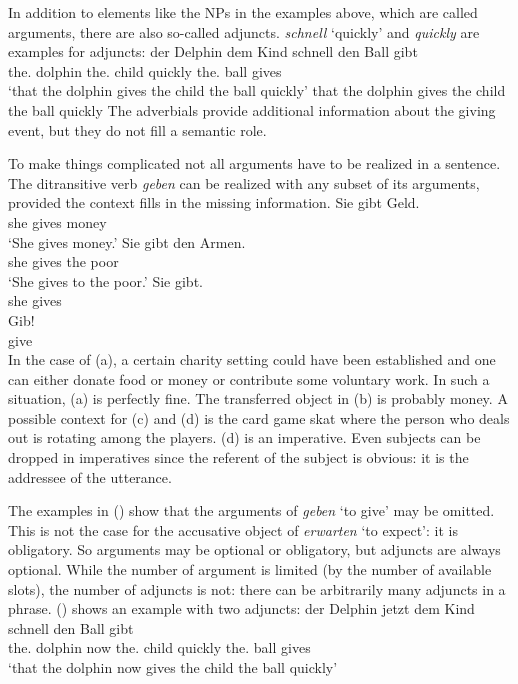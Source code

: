 In addition to elements like the NPs in the examples above, which are called arguments,
there are also so-called adjuncts. \emph{schnell} `quickly' and \emph{quickly} are examples for adjuncts:
\eal
\ex
\gll \dass{} der        Delphin dem        Kind  schnell den        Ball gibt\\
     \that{} the.\NOM{} dolphin the.\DAT{} child quickly the.\ACC{} ball gives\\
\glt `that the dolphin gives the child the ball quickly'
\ex that the dolphin gives the child the ball quickly
\zl
The adverbials provide additional information about the giving event, but they do not fill a
semantic role.

To make things complicated not all arguments have to be realized in a sentence. The ditransitive verb \emph{geben} can be
realized with any subset of its arguments, provided the context fills in the missing information.
\eal
\ex 
\gll Sie gibt Geld.\\
     she gives money\\
\glt `She gives money.'
\ex 
\gll Sie gibt den Armen.\\
     she gives the poor\\
\glt `She gives to the poor.'
\ex\label{ex-sie-gibt} 
\gll Sie gibt.\\
     she gives\\
\ex 
\gll Gib!\\
     give\\
\zl
In the case of (a), a certain charity setting could have been established and one can either
donate food or money or contribute some voluntary work. In such a situation, (a) is perfectly
fine. The transferred object in (b) is probably money. A possible context for (c) and
(d) is the card game skat where the person who deals out is rotating among the
players. (d) is an imperative. Even subjects can be dropped in imperatives since the referent
of the subject is obvious: it is the addressee of the utterance. 

The examples in () show that the arguments of \emph{geben} `to give' may be omitted. This is
not the case for the accusative object of \emph{erwarten} `to expect': it is obligatory. So
arguments may be optional or obligatory, but adjuncts are always optional. While the number of
argument is limited (by the number of available slots), the number of adjuncts is not: there can be
arbitrarily many adjuncts in a phrase. () shows an example with two adjuncts:
\ea
\gll \dass{} der        Delphin jetzt dem        Kind  schnell den        Ball gibt\\
     \that{} the.\NOM{} dolphin now   the.\DAT{} child quickly the.\ACC{} ball gives\\
\glt `that the dolphin now gives the child the ball quickly'
\z


